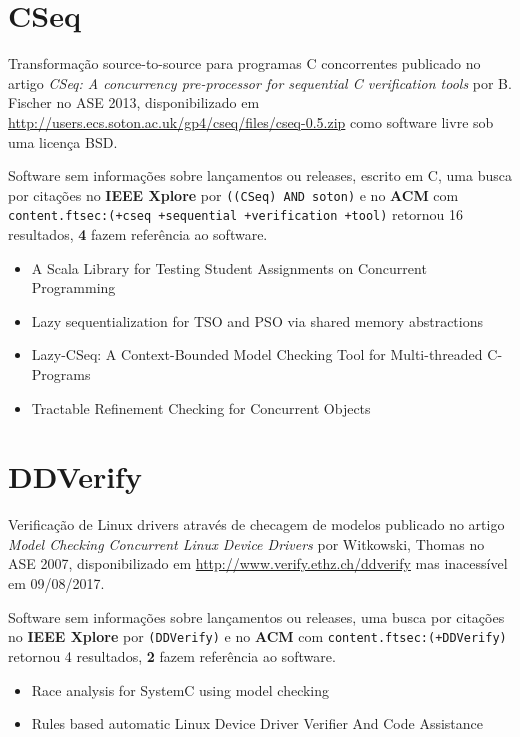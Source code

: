 \section{CSeq}

Transformação source-to-source para programas C concorrentes
publicado no artigo {\it CSeq: A concurrency pre-processor for sequential C verification tools}
por B. Fischer
no ASE 2013,
disponibilizado em \url{http://users.ecs.soton.ac.uk/gp4/cseq/files/cseq-0.5.zip}
como software livre
sob uma licença BSD.

Software sem informações sobre lançamentos ou releases,
escrito em C,
uma busca por citações no {\bf IEEE Xplore} por
\texttt{((CSeq) AND soton)}
e no {\bf ACM} com
\texttt{content.ftsec:(+cseq +sequential +verification +tool)}
retornou
16 resultados,
{\bf 4} fazem referência ao software.

\begin{itemize}
\item A Scala Library for Testing Student Assignments on Concurrent Programming
\item Lazy sequentialization for TSO and PSO via shared memory abstractions
\item Lazy-CSeq: A Context-Bounded Model Checking Tool for Multi-threaded C-Programs
\item Tractable Refinement Checking for Concurrent Objects
\end{itemize}

\section{DDVerify}

Verificação de Linux drivers através de checagem de modelos
publicado no artigo {\it Model Checking Concurrent Linux Device Drivers}
por Witkowski, Thomas
no ASE 2007,
disponibilizado em \url{http://www.verify.ethz.ch/ddverify}
mas inacessível em 09/08/2017.

Software sem informações sobre lançamentos ou releases,
uma busca por citações no {\bf IEEE Xplore} por
\texttt{(DDVerify)}
e no {\bf ACM} com
\texttt{content.ftsec:(+DDVerify)}
retornou
4 resultados,
{\bf 2} fazem referência ao software.

\begin{itemize}
\item Race analysis for SystemC using model checking
\item Rules based automatic Linux Device Driver Verifier And Code Assistance
\end{itemize}

